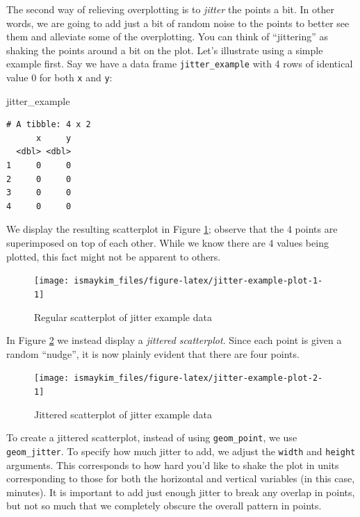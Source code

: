 \documentclass[12pt,]{krantz}
\makeatletter
\newenvironment{Shaded}{\begin{snugshade}}{\end{snugshade}}
\newcommand{\NormalTok}[1]{#1}
\newenvironment{kframe}{%
\medskip{}
\setlength{\fboxsep}{.8em}
 \def\at@end@of@kframe{}%
 \ifinner\ifhmode%
  \def\at@end@of@kframe{\end{minipage}}%
  \begin{minipage}{\columnwidth}%
 \fi\fi%
 \def\FrameCommand##1{\hskip\@totalleftmargin \hskip-\fboxsep
 \colorbox{shadecolor}{##1}\hskip-\fboxsep
     \hskip-\linewidth \hskip-\@totalleftmargin \hskip\columnwidth}%
 \MakeFramed {\advance\hsize-\width
   \@totalleftmargin\z@ \linewidth\hsize
   \@setminipage}}%
 {\par\unskip\endMakeFramed%
 \at@end@of@kframe}
\renewenvironment{Shaded}{\begin{kframe}}{\end{kframe}}
\theoremstyle{definition}
\theoremstyle{definition}
\theoremstyle{definition}
\theoremstyle{remark}
\makeatother
\begin{document}
The second way of relieving overplotting is to \emph{jitter} the points
a bit. In other words, we are going to add just a bit of random noise to
the points to better see them and alleviate some of the overplotting.
You can think of ``jittering'' as shaking the points around a bit on the
plot. Let's illustrate using a simple example first. Say we have a data
frame \texttt{jitter\_example} with 4 rows of identical value 0 for both
\texttt{x} and \texttt{y}:

\begin{Shaded}
\begin{Highlighting}[]
\NormalTok{jitter_example}
\end{Highlighting}
\end{Shaded}

\begin{verbatim}
# A tibble: 4 x 2
      x     y
  <dbl> <dbl>
1     0     0
2     0     0
3     0     0
4     0     0
\end{verbatim}

We display the resulting scatterplot in Figure
\ref{fig:jitter-example-plot-1}; observe that the 4 points are
superimposed on top of each other. While we know there are 4 values
being plotted, this fact might not be apparent to others.

\begin{figure}

{\centering \texttt{[image: ismaykim\_files/figure-latex/jitter-example-plot-1-1]} 

}

\caption{Regular scatterplot of jitter example data}\label{fig:jitter-example-plot-1}
\end{figure}

In Figure \ref{fig:jitter-example-plot-2} we instead display a
\emph{jittered scatterplot}. Since each point is given a random
``nudge'', it is now plainly evident that there are four points.

\begin{figure}

{\centering \texttt{[image: ismaykim\_files/figure-latex/jitter-example-plot-2-1]} 

}

\caption{Jittered scatterplot of jitter example data}\label{fig:jitter-example-plot-2}
\end{figure}

To create a jittered scatterplot, instead of using \texttt{geom\_point},
we use \texttt{geom\_jitter}. To specify how much jitter to add, we
adjust the \texttt{width} and \texttt{height} arguments. This
corresponds to how hard you'd like to shake the plot in units
corresponding to those for both the horizontal and vertical variables
(in this case, minutes). It is important to add just enough jitter to
break any overlap in points, but not so much that we completely obscure
the overall pattern in points.
\end{document}
